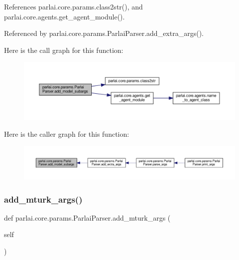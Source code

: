 References parlai.\+core.\+params.\+class2str(), and parlai.\+core.\+agents.\+get\+\_\+agent\+\_\+module().



Referenced by parlai.\+core.\+params.\+Parlai\+Parser.\+add\+\_\+extra\+\_\+args().

Here is the call graph for this function\+:
\nopagebreak
\begin{figure}[H]
\begin{center}
\leavevmode
\includegraphics[width=350pt]{classparlai_1_1core_1_1params_1_1ParlaiParser_a46c57cd479d8780c4c22aecb3135d5fe_cgraph}
\end{center}
\end{figure}
Here is the caller graph for this function\+:
\nopagebreak
\begin{figure}[H]
\begin{center}
\leavevmode
\includegraphics[width=350pt]{classparlai_1_1core_1_1params_1_1ParlaiParser_a46c57cd479d8780c4c22aecb3135d5fe_icgraph}
\end{center}
\end{figure}
\mbox{\label{classparlai_1_1core_1_1params_1_1ParlaiParser_a6043b5b5c36f99f85a9791dd8dc35551}} 
\subsubsection{\texorpdfstring{add\+\_\+mturk\+\_\+args()}{add\_mturk\_args()}}
{\footnotesize\ttfamily def parlai.\+core.\+params.\+Parlai\+Parser.\+add\+\_\+mturk\+\_\+args (\begin{DoxyParamCaption}\item[{}]{self }\end{DoxyParamCaption})}

